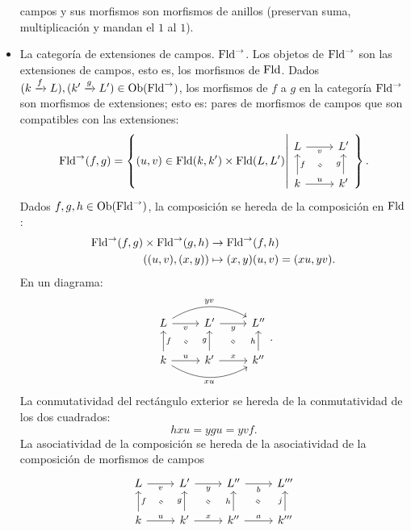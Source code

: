 \begin{exa}
\begin{itemize}
        campos y sus morfismos son morfismos de anillos
        (preservan suma, multiplicación y mandan el $1$ al $1$).
        \item La categoría de extensiones de campos.
        $\mathrm{Fld}^\to$.
        Los objetos de $\mathrm{Fld}^\to$ son las
        extensiones de campos, esto es, los morfismos de $\mathrm{Fld}$.
      Dados $(k\xrightarrow{f} L),(k'\xrightarrow{g}L')\in\mathrm{Ob}(\mathrm{Fld}^\to)$,
      los morfismos de $f$ a $g$ en la categoría $\mathrm{Fld}^\to$
      son morfismos de extensiones; esto es:
      pares de morfismos de campos que son compatibles con
      las extensiones:
      \[
        \Fld^\to(f,g)
        = \left\{
          (u,v)\in \Fld(k,k')\times \Fld(L,L')
          \middle|
          \begin{tikzcd}
            L \ar[r,"v"'] & L' \\
            k \ar[u,"f"'] \ar[r,"u"] & k' \ar[u,"g"]
            \ar[equal,from=1-1,to=2-2,shorten=5mm]
          \end{tikzcd}
        \right\}
      .\]
    Dados $f,g,h\in\mathrm{Ob}(\mathrm{Fld}^\to)$, la composición se hereda de la
    composición en $\mathrm{Fld}$:
    \begin{align*}
      \mathrm{Fld}^\to(f,g)\times\mathrm{Fld}^\to(g,h) &\to \mathrm{Fld}^\to(f,h) \\
      ((u,v) , (x,y)) &\mapsto (x,y)(u,v)=(xu,yv).
    \end{align*}
    En un diagrama:
    \[
        \begin{tikzcd}
          L \ar[r,"v"'] \ar[rr,bend left,"yv"] & L' \ar[r,"y"'] & L''\\
          k \ar[u,"f"'] \ar[r,"u"] \ar[rr,bend right,"xu"']
          & k' \ar[u,"g"] \ar[r,"x"] & k''\ar[u,"h"]
          \ar[equal,from=1-1,to=2-2,shorten=5mm]
          \ar[equal,from=1-2,to=2-3,shorten=5mm]
        \end{tikzcd}
    .\]
    La conmutatividad del rectángulo exterior se hereda de la
    conmutatividad de los dos cuadrados:
      \[
          hxu = ygu = yvf
      .\]
    La asociatividad de la composición se hereda de la
    asociatividad de la composición de morfismos de campos
    \[
        \begin{tikzcd}
          L \ar[r,"v"'] & L' \ar[r,"y"'] & L'' \ar[r,"b"'] & L'''\\
          k \ar[u,"f"'] \ar[r,"u"]
          & k' \ar[u,"g"] \ar[r,"x"]
          & k''\ar[u,"h"] \ar[r,"a"]
          & k''' \ar[u,"j"]
          \ar[equal,from=1-1,to=2-2,shorten=5mm]
          \ar[equal,from=1-2,to=2-3,shorten=5mm]
          \ar[equal,from=1-3,to=2-4,shorten=5mm]
        \end{tikzcd}
\]
\end{itemize}
\end{exa}
